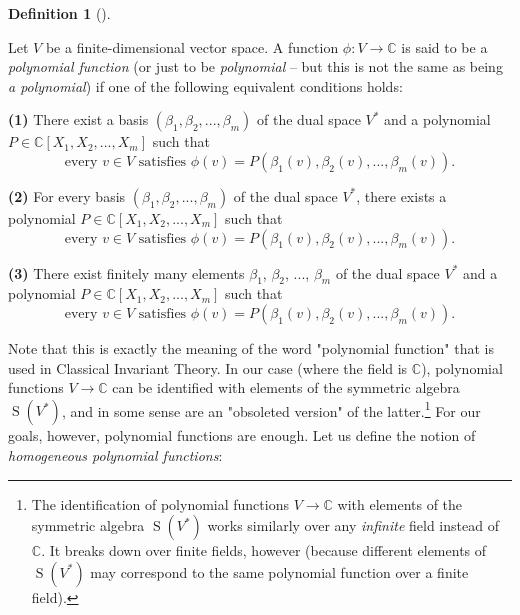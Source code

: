 \documentclass
[numbers=enddot,12pt,final,onecolumn,german,notitlepage]{scrartcl}%
\theoremstyle{definition}
\newtheorem{defi}[theo]{Definition}
\newenvironment{definition}[1][]
{\begin{defi}[#1]\begin{leftbar}}
{\end{leftbar}\end{defi}}
\begin{document}
\begin{definition}
\label{def.det.US.poly}Let $V$ be a finite-dimensional vector space. A
function $\phi:V\rightarrow\mathbb{C}$ is said to be a \textit{polynomial
function} (or just to be \textit{polynomial} -- but this is not the same as
being \textit{a polynomial}) if one of the following equivalent conditions holds:

\textbf{(1)} There exist a basis $\left(  \beta_{1},\beta_{2},...,\beta
_{m}\right)  $ of the dual space $V^{\ast}$ and a polynomial $P\in
\mathbb{C}\left[  X_{1},X_{2},...,X_{m}\right]  $ such that%
\[
\text{every }v\in V\text{ satisfies }\phi\left(  v\right)  =P\left(  \beta
_{1}\left(  v\right)  ,\beta_{2}\left(  v\right)  ,...,\beta_{m}\left(
v\right)  \right)  .
\]


\textbf{(2)} For every basis $\left(  \beta_{1},\beta_{2},...,\beta
_{m}\right)  $ of the dual space $V^{\ast}$, there exists a polynomial
$P\in\mathbb{C}\left[  X_{1},X_{2},...,X_{m}\right]  $ such that%
\[
\text{every }v\in V\text{ satisfies }\phi\left(  v\right)  =P\left(  \beta
_{1}\left(  v\right)  ,\beta_{2}\left(  v\right)  ,...,\beta_{m}\left(
v\right)  \right)  .
\]


\textbf{(3)} There exist finitely many elements $\beta_{1}$, $\beta_{2}$,
$...$, $\beta_{m}$ of the dual space $V^{\ast}$ and a polynomial
$P\in\mathbb{C}\left[  X_{1},X_{2},...,X_{m}\right]  $ such that%
\[
\text{every }v\in V\text{ satisfies }\phi\left(  v\right)  =P\left(  \beta
_{1}\left(  v\right)  ,\beta_{2}\left(  v\right)  ,...,\beta_{m}\left(
v\right)  \right)  .
\]

\end{definition}

Note that this is exactly the meaning of the word "polynomial function" that
is used in Classical Invariant Theory. In our case (where the field is
$\mathbb{C}$), polynomial functions $V\rightarrow\mathbb{C}$ can be identified
with elements of the symmetric algebra $\operatorname*{S}\left(  V^{\ast
}\right)  $, and in some sense are an "obsoleted version" of the
latter.\footnote{The identification of polynomial functions $V\rightarrow
\mathbb{C}$ with elements of the symmetric algebra $\operatorname*{S}\left(
V^{\ast}\right)  $ works similarly over any \textit{infinite} field instead of
$\mathbb{C}$. It breaks down over finite fields, however (because different
elements of $\operatorname*{S}\left(  V^{\ast}\right)  $ may correspond to the
same polynomial function over a finite field).} For our goals, however,
polynomial functions are enough. Let us define the notion of
\textit{homogeneous polynomial functions}:
\end{document}
